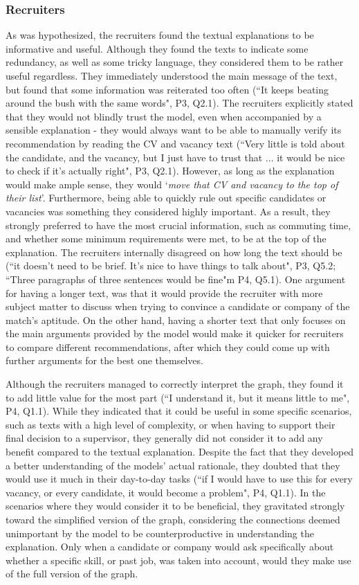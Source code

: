 \subsubsection{Recruiters}
As was hypothesized, the recruiters found the textual explanations to be informative and useful. Although they found the texts to indicate some redundancy, as well as some tricky language, they considered them to be rather useful regardless. They immediately understood the main message of the text, but found that some information was reiterated too often (``It keeps beating around the bush with the same words", P3, Q2.1). The recruiters explicitly stated that they would not blindly trust the model, even when accompanied by a sensible explanation - they would always want to be able to manually verify its recommendation by reading the CV and vacancy text (``Very little is told about the candidate, and the vacancy, but I just have to trust that ... it would be nice to check if it's actually right", P3, Q2.1). However, as long as the explanation would make ample sense, they would `\textit{move that CV and vacancy to the top of their list}'. Furthermore, being able to quickly rule out specific candidates or vacancies was something they considered highly important. As a result, they strongly preferred to have the most crucial information, such as commuting time, and whether some minimum requirements were met, to be at the top of the explanation. The recruiters internally disagreed on how long the text should be (``it doesn't need to be brief. It's nice to have things to talk about", P3, Q5.2; ``Three paragraphs of three sentences would be fine"m P4, Q5.1). One argument for having a longer text, was that it would provide the recruiter with more subject matter to discuss when trying to convince a candidate or company of the match's aptitude. On the other hand, having a shorter text that only focuses on the main arguments provided by the model would make it quicker for recruiters to compare different recommendations, after which they could come up with further arguments for the best one themselves. 

Although the recruiters managed to correctly interpret the graph, they found it to add little value for the most part (``I understand it, but it means little to me", P4, Q1.1). While they indicated that it could be useful in some specific scenarios, such as texts with a high level of complexity, or when having to support their final decision to a supervisor, they generally did not consider it to add any benefit compared to the textual explanation. Despite the fact that they developed a better understanding of the models' actual rationale, they doubted that they would use it much in their day-to-day tasks (``if I would have to use this for every vacancy, or every candidate, it would become a problem", P4, Q1.1). In the scenarios where they would consider it to be beneficial, they gravitated strongly toward the simplified version of the graph, considering the connections deemed unimportant by the model to be counterproductive in understanding the explanation. Only when a candidate or company would ask specifically about whether a specific skill, or past job, was taken into account, would they make use of the full version of the graph. 

